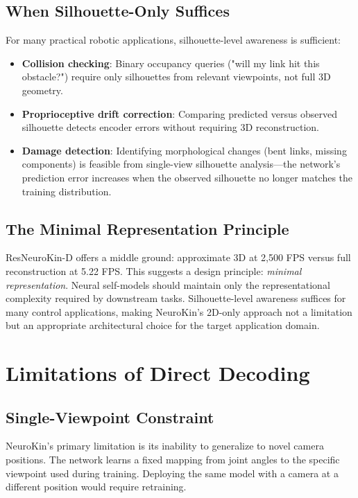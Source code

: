 \documentclass[12pt,a4paper,oneside]{report}
\begin{document}
\subsection{When Silhouette-Only Suffices}

For many practical robotic applications, silhouette-level awareness is sufficient:

\begin{itemize}
    \item \textbf{Collision checking}: Binary occupancy queries ("will my link hit this obstacle?") require only silhouettes from relevant viewpoints, not full 3D geometry.
    \item \textbf{Proprioceptive drift correction}: Comparing predicted versus observed silhouette detects encoder errors without requiring 3D reconstruction.
    \item \textbf{Damage detection}: Identifying morphological changes (bent links, missing components) is feasible from single-view silhouette analysis—the network's prediction error increases when the observed silhouette no longer matches the training distribution.
\end{itemize}

\subsection{The Minimal Representation Principle}

ResNeuroKin-D offers a middle ground: approximate 3D at 2,500 FPS versus full reconstruction at 5.22 FPS. This suggests a design principle: \textit{minimal representation}. Neural self-models should maintain only the representational complexity required by downstream tasks. Silhouette-level awareness suffices for many control applications, making NeuroKin's 2D-only approach not a limitation but an appropriate architectural choice for the target application domain.

\section{Limitations of Direct Decoding}

\subsection{Single-Viewpoint Constraint}

NeuroKin's primary limitation is its inability to generalize to novel camera positions. The network learns a fixed mapping from joint angles to the specific viewpoint used during training. Deploying the same model with a camera at a different position would require retraining.
\end{document}
